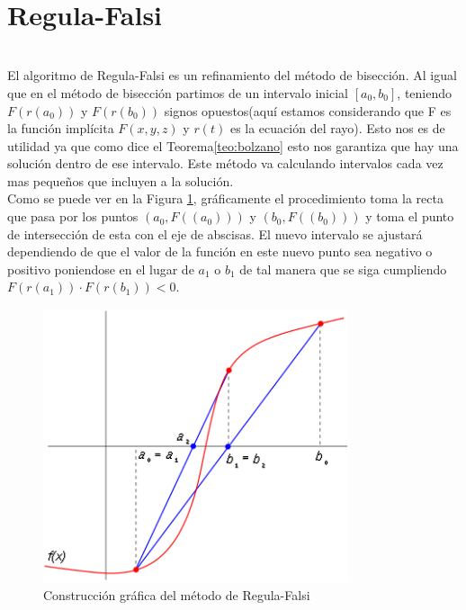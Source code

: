 ${ }$\\
\section{Regula-Falsi}
${ }$\\

El algoritmo de Regula-Falsi es un refinamiento del método de bisección. Al igual que en el método de bisección partimos de un intervalo inicial $[a_0, b_0]$, teniendo $F(r(a_0))$ y $F(r(b_0))$ signos opuestos(aquí estamos considerando que F es la función implícita $F(x,y,z)$ y $r(t)$ es la ecuación del rayo). Esto nos es de utilidad ya que como dice el Teorema\ref{teo:bolzano} esto nos garantiza que hay una solución dentro de ese intervalo. Este método va calculando intervalos cada vez mas pequeños que incluyen a la solución.
${ }$\\

Como se puede ver en la Figura \ref{fig:etiq_8}, gráficamente el procedimiento toma la recta que pasa por los puntos $(a_0, F((a_0)))$ y $(b_0, F((b_0)))$ y toma el punto de intersección de esta con el eje de abscisas. El nuevo intervalo se ajustará dependiendo de que el valor de la función en este nuevo punto sea negativo o positivo poniendose en el lugar de $a_1$ o $b_1$ de tal manera que se siga cumpliendo $F(r(a_1)) \cdot F(r(b_1)) < 0$.
${ }$\\

\begin{figure}[h]
	\begin{center}
		\includegraphics[width=0.8\textwidth]{imagenes/regulaF.png}
	\end{center}
	\caption{Construcción gráfica del método de Regula-Falsi}
	\label{fig:etiq_8}
\end{figure}
${ }$\\

